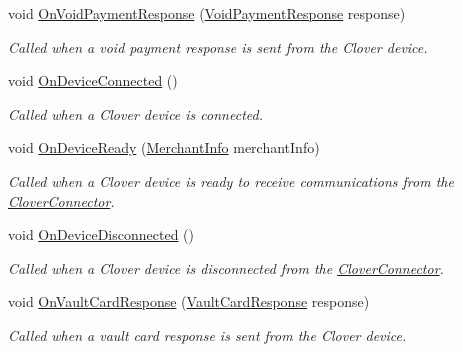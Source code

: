 \begin{DoxyCompactItemize}
void \hyperlink{interfacecom_1_1clover_1_1remotepay_1_1sdk_1_1_i_clover_connector_listener_adc94ebf628d9ad0bf3f2b537f1de30f2}{On\+Void\+Payment\+Response} (\hyperlink{classcom_1_1clover_1_1remotepay_1_1sdk_1_1_void_payment_response}{Void\+Payment\+Response} response)
\begin{DoxyCompactList}\small\item\em Called when a void payment response is sent from the Clover device. \end{DoxyCompactList}\item 
void \hyperlink{interfacecom_1_1clover_1_1remotepay_1_1sdk_1_1_i_clover_connector_listener_aa859c19d05f11d75365161fb96c54eda}{On\+Device\+Connected} ()
\begin{DoxyCompactList}\small\item\em Called when a Clover device is connected. \end{DoxyCompactList}\item 
void \hyperlink{interfacecom_1_1clover_1_1remotepay_1_1sdk_1_1_i_clover_connector_listener_a6c7bff0d9fe64dc624fb175ef33e5299}{On\+Device\+Ready} (\hyperlink{classcom_1_1clover_1_1remotepay_1_1sdk_1_1_merchant_info}{Merchant\+Info} merchant\+Info)
\begin{DoxyCompactList}\small\item\em Called when a Clover device is ready to receive communications from the \hyperlink{classcom_1_1clover_1_1remotepay_1_1sdk_1_1_clover_connector}{Clover\+Connector}. \end{DoxyCompactList}\item 
void \hyperlink{interfacecom_1_1clover_1_1remotepay_1_1sdk_1_1_i_clover_connector_listener_abd56956db2761cb9cfcd2af83647bb8f}{On\+Device\+Disconnected} ()
\begin{DoxyCompactList}\small\item\em Called when a Clover device is disconnected from the \hyperlink{classcom_1_1clover_1_1remotepay_1_1sdk_1_1_clover_connector}{Clover\+Connector}. \end{DoxyCompactList}\item 
void \hyperlink{interfacecom_1_1clover_1_1remotepay_1_1sdk_1_1_i_clover_connector_listener_a1abb7953534d225a8f6a2e9c43dac34e}{On\+Vault\+Card\+Response} (\hyperlink{classcom_1_1clover_1_1remotepay_1_1sdk_1_1_vault_card_response}{Vault\+Card\+Response} response)
\begin{DoxyCompactList}\small\item\em Called when a vault card response is sent from the Clover device. \end{DoxyCompactList}\item 

\end{DoxyCompactItemize}
